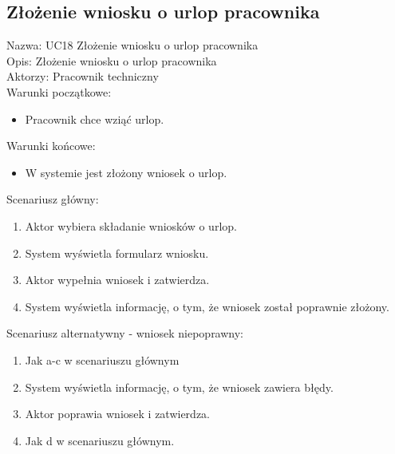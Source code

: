 \subsection{Złożenie wniosku o urlop pracownika}
Nazwa: UC18 Złożenie wniosku o urlop pracownika \\
Opis: Złożenie wniosku o urlop pracownika \\
Aktorzy: Pracownik techniczny \\
Warunki początkowe:
\begin{itemize}
\item Pracownik chce wziąć urlop.
\end{itemize}
Warunki końcowe:
\begin{itemize}
\item W systemie jest złożony wniosek o urlop.
\end{itemize}
Scenariusz główny:
\begin{enumerate}
\item Aktor wybiera składanie wniosków o urlop.
\item System wyświetla formularz wniosku.
\item Aktor wypełnia wniosek i zatwierdza.
\item System wyświetla informację, o tym, że wniosek został poprawnie złożony.
\end{enumerate}
Scenariusz alternatywny - wniosek niepoprawny: 
\begin{enumerate}
\item Jak a-c w scenariuszu głównym
\item System wyświetla informację, o tym, że wniosek zawiera błędy.
\item Aktor poprawia wniosek i zatwierdza.
\item Jak d w scenariuszu głównym.
\end{enumerate}

